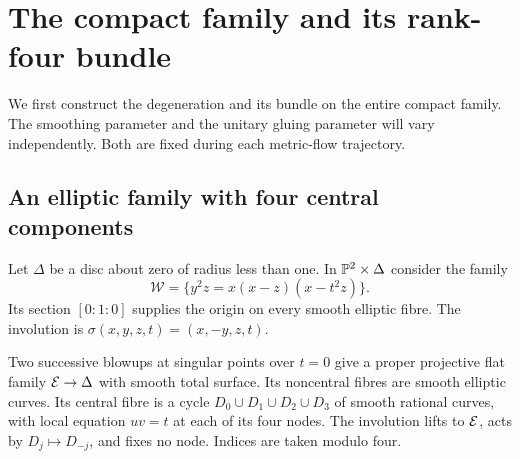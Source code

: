 \section{The compact family and its rank-four bundle}\label{sec:geometry}

We first construct the degeneration and its bundle on the entire compact
family. The smoothing parameter and the unitary gluing parameter will vary
independently. Both are fixed during each metric-flow trajectory.

\subsection{An elliptic family with four central components}
Let $\Delta$ be a disc about zero of radius less than one. In
$\mathbb P^2\times\Delta$ consider the family
\begin{equation}\label{eq:cubic}
 \mathcal W=\{y^2z=x(x-z)(x-t^2z)\}.
\end{equation}
Its section $[0:1:0]$ supplies the origin on every smooth elliptic fibre.
The involution is $\sigma(x,y,z,t)=(x,-y,z,t)$.

\begin{proposition}\label{prop:elliptic-family}
Two successive blowups at singular points over $t=0$ give a proper
projective flat family $\mathcal E\to\Delta$ with smooth total surface. Its
noncentral fibres are smooth elliptic curves. Its central fibre is a cycle
$D_0\cup D_1\cup D_2\cup D_3$ of smooth rational curves, with local
equation $uv=t$ at each of its four nodes. The involution lifts to $\mathcal E$,
acts by $D_j\mapsto D_{-j}$, and fixes no node. Indices are taken modulo four.
\end{proposition}

